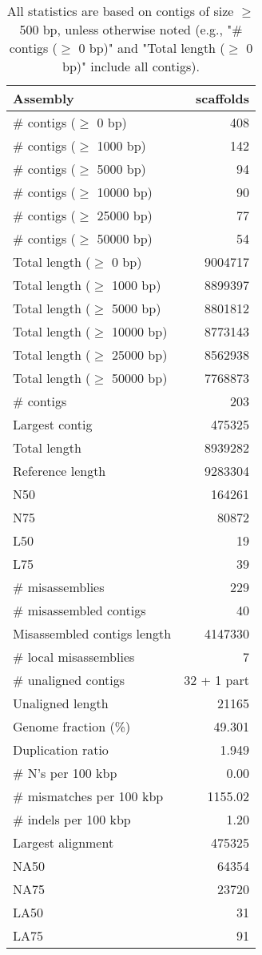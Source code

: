 \documentclass[12pt,a4paper]{article}
\begin{document}
\begin{table}[ht]
\begin{center}
\caption{All statistics are based on contigs of size $\geq$ 500 bp, unless otherwise noted (e.g., "\# contigs ($\geq$ 0 bp)" and "Total length ($\geq$ 0 bp)" include all contigs).}
\begin{tabular}{|l*{1}{|r}|}
\hline
Assembly & scaffolds \\ \hline
\# contigs ($\geq$ 0 bp) & 408 \\ \hline
\# contigs ($\geq$ 1000 bp) & 142 \\ \hline
\# contigs ($\geq$ 5000 bp) & 94 \\ \hline
\# contigs ($\geq$ 10000 bp) & 90 \\ \hline
\# contigs ($\geq$ 25000 bp) & 77 \\ \hline
\# contigs ($\geq$ 50000 bp) & 54 \\ \hline
Total length ($\geq$ 0 bp) & 9004717 \\ \hline
Total length ($\geq$ 1000 bp) & 8899397 \\ \hline
Total length ($\geq$ 5000 bp) & 8801812 \\ \hline
Total length ($\geq$ 10000 bp) & 8773143 \\ \hline
Total length ($\geq$ 25000 bp) & 8562938 \\ \hline
Total length ($\geq$ 50000 bp) & 7768873 \\ \hline
\# contigs & 203 \\ \hline
Largest contig & 475325 \\ \hline
Total length & 8939282 \\ \hline
Reference length & 9283304 \\ \hline
N50 & 164261 \\ \hline
N75 & 80872 \\ \hline
L50 & 19 \\ \hline
L75 & 39 \\ \hline
\# misassemblies & 229 \\ \hline
\# misassembled contigs & 40 \\ \hline
Misassembled contigs length & 4147330 \\ \hline
\# local misassemblies & 7 \\ \hline
\# unaligned contigs & 32 + 1 part \\ \hline
Unaligned length & 21165 \\ \hline
Genome fraction (\%) & 49.301 \\ \hline
Duplication ratio & 1.949 \\ \hline
\# N's per 100 kbp & 0.00 \\ \hline
\# mismatches per 100 kbp & 1155.02 \\ \hline
\# indels per 100 kbp & 1.20 \\ \hline
Largest alignment & 475325 \\ \hline
NA50 & 64354 \\ \hline
NA75 & 23720 \\ \hline
LA50 & 31 \\ \hline
LA75 & 91 \\ \hline
\end{tabular}
\end{center}
\end{table}
\end{document}
